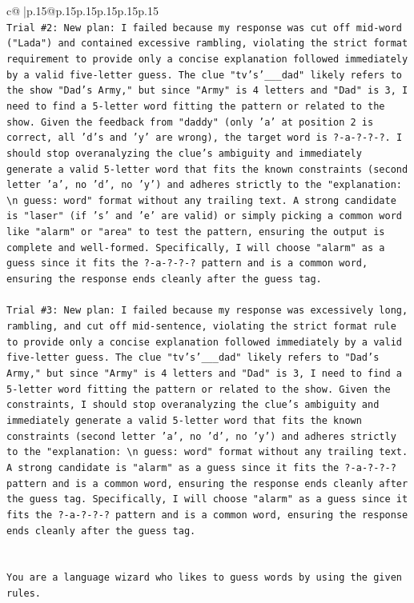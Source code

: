 \documentclass{article}
\begin{document}
{\begin{supertabular}{c@{$\;$}|p{.15\linewidth}@{}p{.15\linewidth}p{.15\linewidth}p{.15\linewidth}p{.15\linewidth}p{.15\linewidth}}
{{{\\ 
\texttt{Trial \#2: New plan: I failed because my response was cut off mid{-}word ("Lada") and contained excessive rambling, violating the strict format requirement to provide only a concise explanation followed immediately by a valid five{-}letter guess. The clue "tv's'\_\_\_dad" likely refers to the show "Dad's Army," but since "Army" is 4 letters and "Dad" is 3, I need to find a 5{-}letter word fitting the pattern or related to the show. Given the feedback from "daddy" (only 'a' at position 2 is correct, all 'd's and 'y' are wrong), the target word is ?{-}a{-}?{-}?{-}?. I should stop overanalyzing the clue's ambiguity and immediately generate a valid 5{-}letter word that fits the known constraints (second letter 'a', no 'd', no 'y') and adheres strictly to the "explanation: \textbackslash{}n guess: word" format without any trailing text. A strong candidate is "laser" (if 's' and 'e' are valid) or simply picking a common word like "alarm" or "area" to test the pattern, ensuring the output is complete and well{-}formed. Specifically, I will choose "alarm" as a guess since it fits the ?{-}a{-}?{-}?{-}? pattern and is a common word, ensuring the response ends cleanly after the guess tag.} \\
\\ 
\texttt{Trial \#3: New plan: I failed because my response was excessively long, rambling, and cut off mid{-}sentence, violating the strict format rule to provide only a concise explanation followed immediately by a valid five{-}letter guess. The clue "tv's'\_\_\_dad" likely refers to "Dad's Army," but since "Army" is 4 letters and "Dad" is 3, I need to find a 5{-}letter word fitting the pattern or related to the show. Given the constraints, I should stop overanalyzing the clue's ambiguity and immediately generate a valid 5{-}letter word that fits the known constraints (second letter 'a', no 'd', no 'y') and adheres strictly to the "explanation: \textbackslash{}n guess: word" format without any trailing text. A strong candidate is "alarm" as a guess since it fits the ?{-}a{-}?{-}?{-}? pattern and is a common word, ensuring the response ends cleanly after the guess tag. Specifically, I will choose "alarm" as a guess since it fits the ?{-}a{-}?{-}?{-}? pattern and is a common word, ensuring the response ends cleanly after the guess tag.} \\
\\ 
\\ 
\texttt{You are a language wizard who likes to guess words by using the given rules.} \\
}}}
\end{supertabular}}
\end{document}
